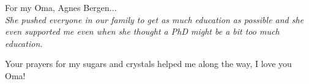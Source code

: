  
\begin{epigraph}
	\Large
	For my Oma, Agnes Bergen...\\
	\textit{She pushed everyone in our family to get as much education as possible and she even supported me even when she thought a PhD might be a bit too much education.} 

	Your prayers for my sugars and crystals helped me along the way, I love you Oma!
\end{epigraph}